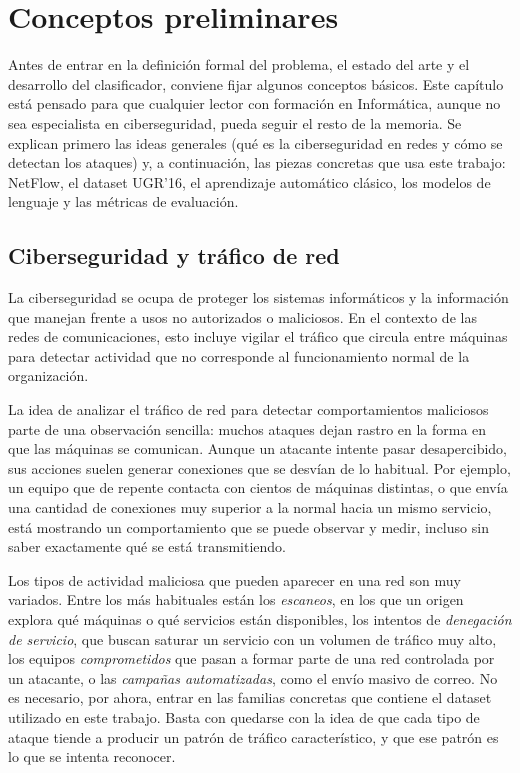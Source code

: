 \chapter{Conceptos preliminares}
\label{cap:conceptos}

Antes de entrar en la definición formal del problema, el estado del arte y el desarrollo del clasificador, conviene fijar algunos conceptos básicos. Este capítulo está pensado para que cualquier lector con formación en Informática, aunque no sea especialista en ciberseguridad, pueda seguir el resto de la memoria. Se explican primero las ideas generales (qué es la ciberseguridad en redes y cómo se detectan los ataques) y, a continuación, las piezas concretas que usa este trabajo: NetFlow, el dataset UGR'16, el aprendizaje automático clásico, los modelos de lenguaje y las métricas de evaluación.

\section{Ciberseguridad y tráfico de red}
\label{sec:concep_ciberseguridad}

La ciberseguridad se ocupa de proteger los sistemas informáticos y la información que manejan frente a usos no autorizados o maliciosos. En el contexto de las redes de comunicaciones, esto incluye vigilar el tráfico que circula entre máquinas para detectar actividad que no corresponde al funcionamiento normal de la organización.

La idea de analizar el tráfico de red para detectar comportamientos maliciosos parte de una observación sencilla: muchos ataques dejan rastro en la forma en que las máquinas se comunican. Aunque un atacante intente pasar desapercibido, sus acciones suelen generar conexiones que se desvían de lo habitual. Por ejemplo, un equipo que de repente contacta con cientos de máquinas distintas, o que envía una cantidad de conexiones muy superior a la normal hacia un mismo servicio, está mostrando un comportamiento que se puede observar y medir, incluso sin saber exactamente qué se está transmitiendo.

Los tipos de actividad maliciosa que pueden aparecer en una red son muy variados. Entre los más habituales están los \emph{escaneos}, en los que un origen explora qué máquinas o qué servicios están disponibles, los intentos de \emph{denegación de servicio}, que buscan saturar un servicio con un volumen de tráfico muy alto, los equipos \emph{comprometidos} que pasan a formar parte de una red controlada por un atacante, o las \emph{campañas automatizadas}, como el envío masivo de correo. No es necesario, por ahora, entrar en las familias concretas que contiene el dataset utilizado en este trabajo. Basta con quedarse con la idea de que cada tipo de ataque tiende a producir un patrón de tráfico característico, y que ese patrón es lo que se intenta reconocer.

